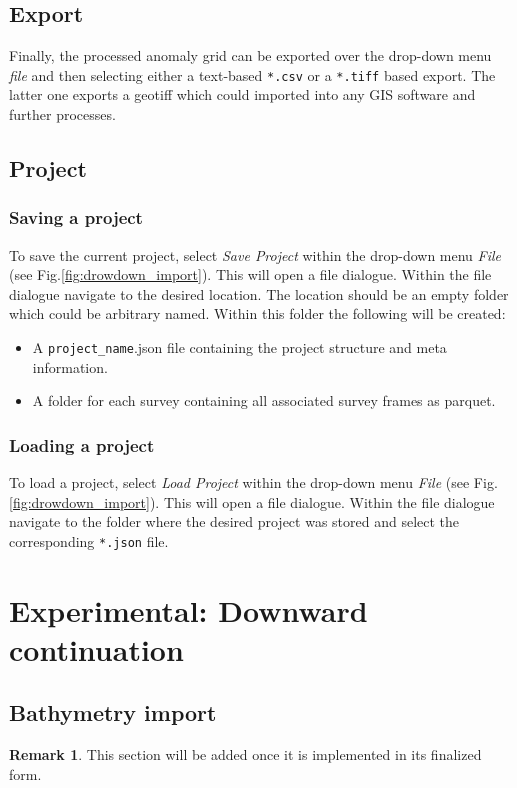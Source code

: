 \documentclass[12pt]{article}
\theoremstyle{definition}
\newtheorem*{remark}{Remark}
\begin{document}
\subsection{Export}

Finally, the processed anomaly grid can be exported over the drop-down menu {\em file} and then selecting either a text-based \verb|*.csv| or a \verb|*.tiff| based export.
The latter one exports a geotiff which could imported into any GIS software and further processes.

\subsection{Project}

\subsubsection{Saving a project}
To save the current project, select {\em Save Project} within the drop-down menu {\em File} (see Fig.\ref{fig:drowdown_import}).
This will open a file dialogue.
Within the file dialogue navigate to the desired location.
The location should be an empty folder which could be arbitrary named.
Within this folder the following will be created:
\begin{itemize}
	\item A \verb|project_name|.json file containing the project structure and meta information. 
	\item A folder for each survey containing all associated survey frames as parquet. 
\end{itemize}



\subsubsection{Loading a project}
To load a project, select {\em Load Project} within the drop-down menu {\em File} (see Fig.\ref{fig:drowdown_import}).
This will open a file dialogue.
Within the file dialogue navigate to the folder where the desired project was stored and select the corresponding \verb|*.json| file.

\section{Experimental: Downward continuation}
\label{sec:downwardContinuation}

\subsection{Bathymetry import}
\begin{remark}
	This section will be added once it is implemented in its finalized form.
\end{remark}


	
\printbibliography
\end{document}

